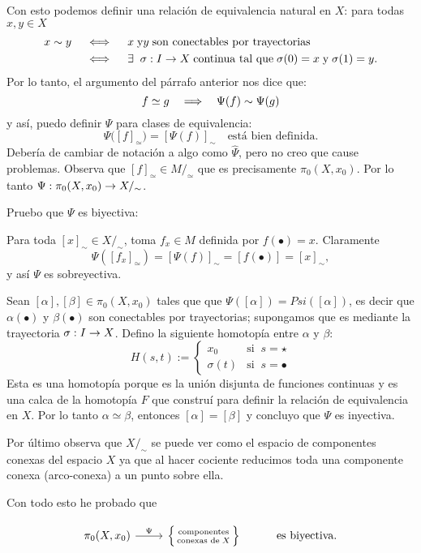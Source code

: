 \documentclass[../../topologia_algebraica]{subfiles}
\begin{document}
Con esto podemos definir una relaci\'on de equivalencia natural en $X$: para todas $x,y\in X$
\begin{align*}%
  x\sim y & \quad\iff\quad x \;\text{y} y \;\text{son conectables por trayectorias}\\ &%
  \quad\iff\quad%
  \exists\;\; \sigma:I\ra X \;\text{continua tal que}\; \sigma(0)=x \;\text{y}\; \sigma(1)=y.%
\end{align*}%
Por lo tanto, el argumento del p\'arrafo anterior nos dice que:
\[
  f\simeq g \quad\Longrightarrow\quad \Psi(f)\sim \Psi(g)
\]
y as\'i, puedo definir $\Psi$ para clases de equivalencia:
\[
  \Psi\big( [f]_{\simeq} \big)= [\Psi(f)]_{\sim} \quad\text{est\'a bien definida}.
\]
Deber\'ia de cambiar de notaci\'on a algo como $\hat{\Psi}$, pero no creo que cause problemas.
Observa que $[f]_{\simeq}\in M/_{\simeq}$ que es precisamente $\pi_0(X,x_0)$. Por lo tanto
$\Psi:\pi_0(X,x_0)\rightarrow X/_{\sim}$.

Pruebo que $\Psi$ es biyectiva:

Para toda $[x]_{\sim}\in X/_{\sim}$, toma $f_x\in M$ definida por $f(\bullet)=x$. Claramente
\[
  \Psi([f_x]_{\simeq})=[\Psi(f)]_{\sim}=[f(\bullet)]=[x]_{\sim},
\]
y as\'i $\Psi$ es sobreyectiva.

Sean $[\alpha],[\beta]\in\pi_0(X,x_0)$ tales que  que $\Psi([\alpha])=Psi([\alpha])$, es decir que
$\alpha(\bullet)$ y $\beta(\bullet)$ son conectables por trayectorias; supongamos que es mediante
la trayectoria $\sigma:I\rightarrow X$. Defino la siguiente homotop\'ia entre $\alpha$ y $\beta$:
\[
  H(s,t):=
  \begin{cases}
    x_0 & \text{si}\;\; s=\star \\
    \sigma(t) & \text{si}\;\; s=\bullet
  \end{cases}
\]
Esta es una homotop\'ia porque es la uni\'on disjunta de funciones continuas y es una calca de
la homotop\'ia $F$ que constru\'i para definir la relaci\'on de equivalencia en $X$. Por lo
tanto $\alpha\simeq\beta$, entonces $[\alpha]=[\beta]$ y concluyo que $\Psi$ es inyectiva.

Por \'ultimo observa que $X/_{\sim}$ se puede ver como el espacio de componentes conexas
del espacio $X$ ya que al hacer cociente reducimos toda una componente conexa (arco-conexa)
a un punto sobre ella.

Con todo esto he probado que
\begin{prop}\label{pi_cero_componentes}
  \[
  \begin{tikzcd}
    \pi_0(X,x_0) \arrow[r,"\Psi"] &
    \Big\{  \begin{smallmatrix}\text{componentes}\\ \text{conexas de}\; X\end{smallmatrix}  \Big\}&
    \text{es biyectiva.}
  \end{tikzcd}
\]
\end{prop}
\end{document}
